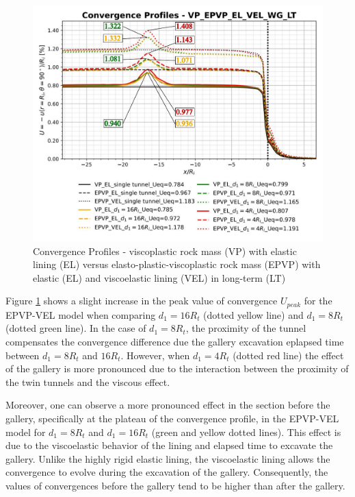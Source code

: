 \documentclass[a4paper,fleqn]{cas-sc}
\begin{document}
\begin{figure}[h!]
	\centering
	\includegraphics[scale=0.6]{Convergence Profiles - VP_EPVP_EL_VEL_WG_LT.pdf}
	\caption{Convergence Profiles - viscoplastic rock mass (VP) with elastic lining (EL) versus elasto-plastic-viscoplastic rock mass (EPVP) with elastic (EL) and viscoelastic lining (VEL) in long-term (LT)}
	\label{VP-EL-EPVP-VEL-WG-LT}
\end{figure}
\FloatBarrier
Figure \ref{VP-EL-EPVP-VEL-WG-LT} shows a slight increase in the peak value of convergence $U_{peak}$ for the EPVP-VEL model when comparing $d_1 = 16R_t$ (dotted yellow line) and $d_1 = 8R_t$ (dotted green line). In the case of $d_1 = 8R_t$, the proximity of the tunnel compensates the convergence difference due the gallery excavation eplapsed time between $d_1 = 8R_t$ and $16 R_t$. However, when $d_1 = 4R_t$ (dotted red line) the effect of the gallery is more pronounced due to the interaction between the proximity of the twin tunnels and the viscous effect. 

Moreover, one can observe a more pronounced effect in the section before the gallery, specifically at the plateau of the convergence profile, in the EPVP-VEL model for $d_1 = 8R_t$ and $d_1 = 16R_t$ (green and yellow dotted lines). This effect is due to the viscoelastic behavior of the lining and elapsed time to excavate the gallery. Unlike the highly rigid elastic lining, the viscoelastic lining allows the convergence to evolve during the excavation of the gallery. Consequently, the values of convergences before the gallery tend to be higher than after the gallery.
\end{document}
